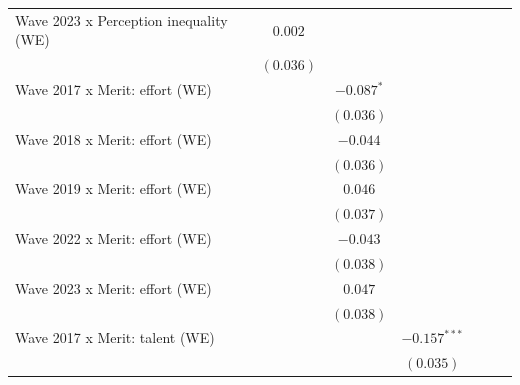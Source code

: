\documentclass[
  12pt,
]{article}
\begin{document}
\begin{table}
{\begin{center}
{\begin{tabular}{l c c c c c c}
Wave 2023 x Perception inequality (WE)             & $0.002$       &               &                &              &               &               \\
                                                   & $(0.036)$     &               &                &              &               &               \\
Wave 2017 x Merit: effort (WE)                     &               & $-0.087^{*}$  &                &              &               &               \\
                                                   &               & $(0.036)$     &                &              &               &               \\
Wave 2018 x Merit: effort (WE)                     &               & $-0.044$      &                &              &               &               \\
                                                   &               & $(0.036)$     &                &              &               &               \\
Wave 2019 x Merit: effort (WE)                     &               & $0.046$       &                &              &               &               \\
                                                   &               & $(0.037)$     &                &              &               &               \\
Wave 2022 x Merit: effort (WE)                     &               & $-0.043$      &                &              &               &               \\
                                                   &               & $(0.038)$     &                &              &               &               \\
Wave 2023 x Merit: effort (WE)                     &               & $0.047$       &                &              &               &               \\
                                                   &               & $(0.038)$     &                &              &               &               \\
Wave 2017 x Merit: talent (WE)                     &               &               & $-0.157^{***}$ &              &               &               \\
                                                   &               &               & $(0.035)$      &              &               &               \\

\end{tabular}}
\end{center}}
\end{table}
\end{document}
